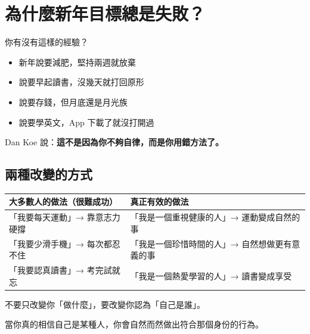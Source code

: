 \documentclass[12pt,a4paper]{article}
\begin{document}
\section{為什麼新年目標總是失敗？}

你有沒有這樣的經驗？

\begin{itemize}
    \item 新年說要減肥，堅持兩週就放棄
    \item 說要早起讀書，沒幾天就打回原形
    \item 說要存錢，但月底還是月光族
    \item 說要學英文，App 下載了就沒打開過
\end{itemize}

Dan Koe 說：\textbf{這不是因為你不夠自律，而是你用錯方法了。}

\subsection{兩種改變的方式}

\begin{longtable}{p{6.5cm}p{7.5cm}}
\toprule
\textbf{大多數人的做法（很難成功）} & \textbf{真正有效的做法} \\
\midrule
\endfirsthead

\bottomrule
\endfoot

「我要每天運動」\newline → 靠意志力硬撐 & 「我是一個重視健康的人」\newline → 運動變成自然的事 \\
\midrule
「我要少滑手機」\newline → 每次都忍不住 & 「我是一個珍惜時間的人」\newline → 自然想做更有意義的事 \\
\midrule
「我要認真讀書」\newline → 考完試就忘 & 「我是一個熱愛學習的人」\newline → 讀書變成享受 \\
\bottomrule
\end{longtable}

\begin{tcolorbox}[colback=emergency_blue!5!white, colframe=emergency_blue, title=\textbf{簡單來說}]
不要只改變你「做什麼」，要改變你認為「自己是誰」。

當你真的相信自己是某種人，你會自然而然做出符合那個身份的行為。
\end{tcolorbox}
\end{document}
